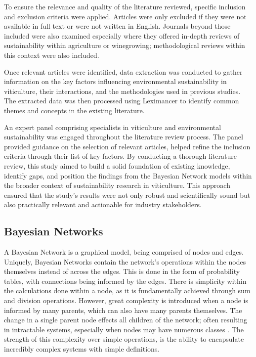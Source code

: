 To ensure the relevance and quality of the literature reviewed, specific inclusion and exclusion criteria were applied. Articles were only excluded if they were not available in full text or were not written in English. Journals beyond those included were also examined especially where they offered in-depth reviews of sustainability within agriculture or winegrowing; methodological reviews within this context were also included.

Once relevant articles were identified, data extraction was conducted to gather information on the key factors influencing environmental sustainability in viticulture, their interactions, and the methodologies used in previous studies. The extracted data was then processed using Leximancer to identify common themes and concepts in the existing literature.

An expert panel comprising specialists in viticulture and environmental sustainability was engaged throughout the literature review process. The panel provided guidance on the selection of relevant articles, helped refine the inclusion criteria through their list of key factors. By conducting a thorough literature review, this study aimed to build a solid foundation of existing knowledge, identify gaps, and position the findings from the Bayesian Network models within the broader context of sustainability research in viticulture. This approach ensured that the study's results were not only robust and scientifically sound but also practically relevant and actionable for industry stakeholders.

\subsection{Bayesian Networks}

A Bayesian Network is a graphical model, being comprised of nodes and edges. Uniquely, Bayesian Networks contain the network's operations within the nodes themselves instead of across the edges. This is done in the form of probability tables, with connections being informed by the edges. There is simplicity within the calculations done within a node, as it is fundamentally achieved through sum and division operations. However, great complexity is introduced when a node is informed by many parents, which can also have many parents themselves. The change in a single parent node effects all children of the network; often resulting in intractable systems, especially when nodes may have numerous classes \citep{korbBayesianArtificialIntelligence2011}. The strength of this complexity over simple operations, is the ability to encapsulate incredibly complex systems with simple definitions.

